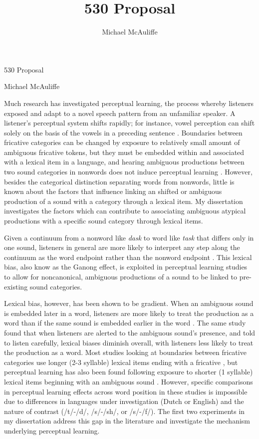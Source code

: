 \documentclass[11pt]{article} %
\title{530 Proposal}
\author{Michael McAuliffe}
\date{} %
\begin{document}
\begin{center}
530 Proposal

Michael McAuliffe
\end{center}

Much research has investigated perceptual learning, the process whereby listeners exposed and adapt to a novel speech pattern from an unfamiliar speaker.  A listener's perceptual system shifts rapidly; for instance, vowel perception can shift solely on the basis of the vowels in a  preceding sentence \citep{LadefogedBroadbent1957}.  Boundaries between fricative categories can be changed by exposure to relatively small amount of ambiguous fricative tokens, but they must be embedded within and associated with a lexical item in a language, and hearing ambiguous productions between two sound categories in nonwords does not induce perceptual learning \citep{NorrisEtAl2003}. However, besides the categorical distinction separating words from nonwords, little is known about the factors that influence linking an shifted or ambiguous production of a sound with a category through a lexical item. My dissertation investigates the factors which can contribute to associating ambiguous atypical productions with a specific sound category through lexical items. 

Given a continuum from a nonword like \emph{dask} to word like \emph{task} that differs only in one sound, listeners in general are more likely to interpret any step along the continuum as the word endpoint rather than the nonword endpoint \citep{Ganong1980}. This lexical bias, also know as the Ganong effect, is exploited in perceptual learning studies to allow for noncanonical, ambiguous productions of a sound to be linked to pre-existing sound categories.

Lexical bias, however, has been shown to be gradient.  When an ambiguous sound is embedded later in a word, listeners are more likely to treat the production as a word than if the same sound is embedded earlier in the word \citep{PittSzostak2012}.  The same study found that when listeners are alerted to the ambiguous sound's presence, and told to listen carefully, lexical biases diminish overall, with listeners less likely to treat the production as a word.    Most studies looking at boundaries between fricative categories use longer (2-3 syllable) lexical items ending with a fricative \citep{NorrisEtAl2003,}, but perceptual learning has also been found following exposure to shorter (1 syllable) lexical items beginning with an ambiguous sound \citep{Clare2014}.  However, specific comparisons in perceptual learning effects across word position in these studies is impossible due to differences in languages under investigation (Dutch or English) and the nature of contrast (/t/-/d/, /s/-/sh/, or /s/-/f/).  The first two experiments in my dissertation address this gap in the literature and investigate the mechanism underlying perceptual learning.
\end{document}
